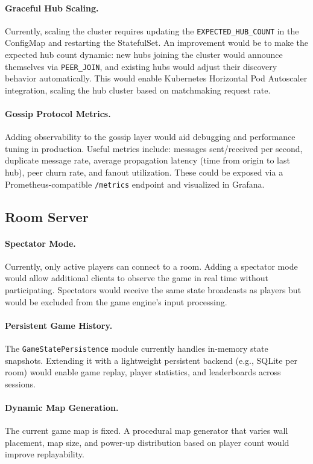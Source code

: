 \paragraph{Graceful Hub Scaling.}
Currently, scaling the cluster requires updating the \texttt{EXPECTED\_HUB\_COUNT} in the ConfigMap and restarting the StatefulSet.
An improvement would be to make the expected hub count dynamic: new hubs joining the cluster would announce themselves via \texttt{PEER\_JOIN}, and existing hubs would adjust their discovery behavior automatically.
This would enable Kubernetes Horizontal Pod Autoscaler integration, scaling the hub cluster based on matchmaking request rate.

\paragraph{Gossip Protocol Metrics.}
Adding observability to the gossip layer would aid debugging and performance tuning in production.
Useful metrics include: messages sent/received per second, duplicate message rate, average propagation latency (time from origin to last hub), peer churn rate, and fanout utilization.
These could be exposed via a Prometheus-compatible \texttt{/metrics} endpoint and visualized in Grafana.

\subsection{Room Server}

\paragraph{Spectator Mode.}
Currently, only active players can connect to a room.
Adding a spectator mode would allow additional clients to observe the game in real time without participating.
Spectators would receive the same state broadcasts as players but would be excluded from the game engine's input processing.

\paragraph{Persistent Game History.}
The \texttt{GameStatePersistence} module currently handles in-memory state snapshots.
Extending it with a lightweight persistent backend (e.g., SQLite per room) would enable game replay, player statistics, and leaderboards across sessions.

\paragraph{Dynamic Map Generation.}
The current game map is fixed.
A procedural map generator that varies wall placement, map size, and power-up distribution based on player count would improve replayability.


